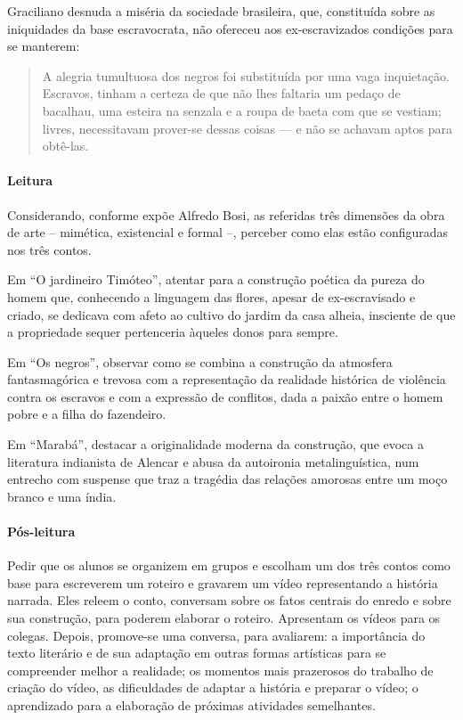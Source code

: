 \documentclass[11pt]{extarticle}
\begin{document}
Graciliano desnuda a miséria da sociedade brasileira, que, constituída
sobre as iniquidades da base escravocrata, não ofereceu aos ex-escravizados
condições para se manterem:

\begin{quote}
A alegria tumultuosa dos negros foi substituída por uma vaga
inquietação. Escravos, tinham a certeza de que não lhes faltaria um
pedaço de bacalhau, uma esteira na senzala e a roupa de baeta com que se
vestiam; livres, necessitavam prover-se dessas coisas --- e não se
achavam aptos para obtê-las.
\end{quote}

\asterisc\paragraph{Leitura}

Considerando, conforme expõe Alfredo Bosi, as referidas três dimensões
da obra de arte -- mimética, existencial e formal --, perceber como elas
estão configuradas nos três contos.

Em ``O jardineiro Timóteo'', atentar para a construção poética da pureza
do homem que, conhecendo a linguagem das flores, apesar de ex-escravisado e
criado, se dedicava com afeto ao cultivo do jardim da casa alheia,
insciente de que a propriedade sequer pertenceria àqueles donos para
sempre.

Em ``Os negros'', observar como se combina a construção da atmosfera
fantasmagórica e trevosa com a representação da realidade histórica de
violência contra os escravos e com a expressão de conflitos, dada a
paixão entre o homem pobre e a filha do fazendeiro.

Em ``Marabá'', destacar a originalidade moderna da construção, que evoca
a literatura indianista de Alencar e abusa da autoironia
metalinguística, num entrecho com suspense que traz a tragédia das
relações amorosas entre um moço branco e uma índia.

\asterisc\paragraph{Pós-leitura}

Pedir que os alunos se organizem em grupos e escolham um dos três contos
como base para escreverem um roteiro e gravarem um vídeo representando a
história narrada. Eles releem o conto, conversam sobre os fatos centrais
do enredo e sobre sua construção, para poderem elaborar o roteiro.
Apresentam os vídeos para os colegas. Depois, promove-se uma conversa,
para avaliarem: a importância do texto literário e de sua adaptação em
outras formas artísticas para se compreender melhor a realidade; os
momentos mais prazerosos do trabalho de criação do vídeo, as
dificuldades de adaptar a história e preparar o vídeo; o aprendizado
para a elaboração de próximas atividades semelhantes.
\end{document}
